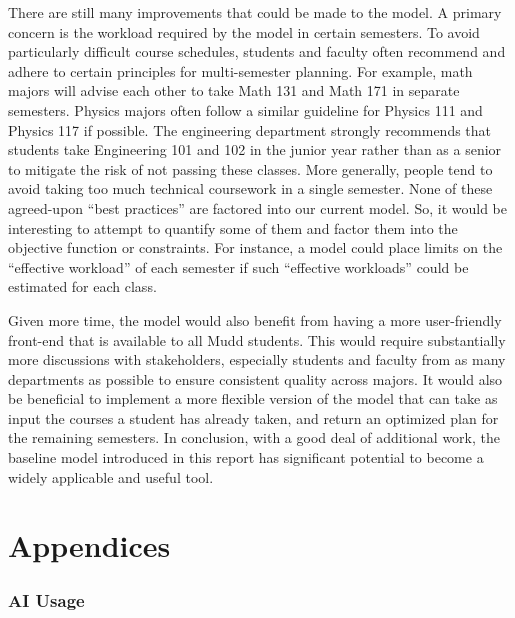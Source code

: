 \documentclass[12pt]{article}
\begin{document}
There are still many improvements that could be made to the model. A primary concern is the workload required by the model in certain semesters. To avoid particularly difficult course schedules, students and faculty often recommend and adhere to certain principles for multi-semester planning. For example, math majors will advise each other to take Math 131 and Math 171 in separate semesters. Physics majors often follow a similar guideline for Physics 111 and Physics 117 if possible. The engineering department strongly recommends that students take Engineering 101 and 102 in the junior year rather than as a senior to mitigate the risk of not passing these classes. More generally, people tend to avoid taking too much technical coursework in a single semester. None of these agreed-upon ``best practices'' are factored into our current model. So, it would be interesting to attempt to quantify some of them and factor them into the objective function or constraints. For instance, a model could place limits on the ``effective workload'' of each semester if such ``effective workloads'' could be estimated for each class.

Given more time, the model would also benefit from having a more user-friendly front-end that is available to all Mudd students. This would require substantially more discussions with stakeholders, especially students and faculty from as many departments as possible to ensure consistent quality across majors. It would also be beneficial to implement a more flexible version of the model that can take as input the courses a student has already taken, and return an optimized plan for the remaining semesters. In conclusion, with a good deal of additional work, the baseline model introduced in this report has significant potential to become a widely applicable and useful tool.

\part{Appendices}

\section{AI Usage}\label{app:ai}
\end{document}
